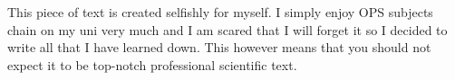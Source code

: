 \documentclass[../ops.tex]{subfiles}
\begin{document}
        This piece of text is created selfishly for myself.
        I simply enjoy OPS subjects chain on my uni very much and I am scared
        that I will forget it so I decided to write all that I have learned
        down.
        This however means that you should not expect it to be top-notch
        professional scientific text.
\end{document}
